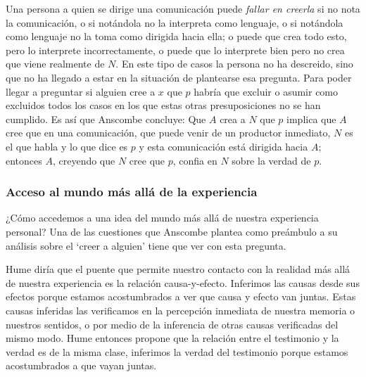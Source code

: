 Una persona a quien se dirige una comunicación puede \emph{fallar en creerla} si
no nota la comunicación, o si notándola no la interpreta como lenguaje, o si
notándola como lenguaje no la toma como dirigida hacia ella; o puede que crea
todo esto, pero lo interprete incorrectamente, o puede que lo interprete bien
pero no crea que viene realmente de $N$. En este tipo de casos la persona no ha
descreido, sino que no ha llegado a estar en la situación de plantearse esa
pregunta. Para poder llegar a preguntar si alguien cree a $x$ que $p$ habría que
excluir o asumir como excluidos todos los casos en los que estas otras
presuposiciones no se han cumplido. Es así que Anscombe concluye:
Que $A$ crea a $N$ que $p$ implica que $A$ cree que en una comunicación, que puede
venir de un productor inmediato, $N$ es el que habla y lo que dice es $p$ y esta
comunicación está dirigida hacia $A$; entonces $A$, creyendo que $N$ cree que
$p$, confia en $N$ sobre la verdad de $p$.

\subsubsection{Acceso al mundo más allá de la experiencia}
¿Cómo accedemos a una idea del mundo más allá de nuestra experiencia personal?
Una de las cuestiones que Anscombe plantea como preámbulo a su análisis sobre el
`creer a alguien' tiene que ver con esta pregunta.

Hume diría que el puente que permite nuestro contacto con la realidad más allá
de nuestra experiencia es la relación
causa-y-efecto\autocite[Cf.~][3]{anscombe2008faith:tobelieve}. Inferimos las
causas desde sus efectos porque estamos acostumbrados a ver que causa y efecto
van juntas. Estas causas inferidas las verificamos en la percepción inmediata de
nuestra memoria o nuestros sentidos, o por medio de la inferencia de otras
causas verificadas del mismo
modo\autocite[Cf.~][88]{anscombe1981parmenides:humeandjulius}. Hume entonces
propone que la relación entre el testimonio y la verdad es de la misma clase,
inferimos la verdad del testimonio porque estamos acostumbrados a que vayan
juntas\autocite[Cf.~][3]{anscombe2008faith:tobelieve}.

